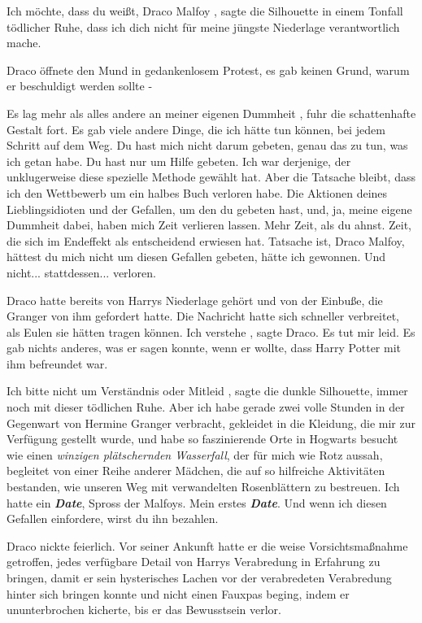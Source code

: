 \glqq Ich möchte, dass du weißt, Draco Malfoy\grqq{} , sagte die Silhouette in
einem Tonfall tödlicher Ruhe, \glqq dass ich dich nicht für meine jüngste
Niederlage verantwortlich mache.\grqq{}

Draco öffnete den Mund in gedankenlosem Protest, es gab keinen Grund, warum er
beschuldigt werden sollte -

\glqq Es lag mehr als alles andere an meiner eigenen Dummheit\grqq{} , fuhr die
schattenhafte Gestalt fort. \glqq Es gab viele andere Dinge, die ich hätte tun
können, bei jedem Schritt auf dem Weg. Du hast mich nicht darum gebeten, genau
das zu tun, was ich getan habe. Du hast nur um Hilfe gebeten. Ich war derjenige,
der unklugerweise diese spezielle Methode gewählt hat. Aber die Tatsache bleibt,
dass ich den Wettbewerb um ein halbes Buch verloren habe. Die Aktionen deines
Lieblingsidioten und der Gefallen, um den du gebeten hast, und, ja, meine eigene
Dummheit dabei, haben mich Zeit verlieren lassen. Mehr Zeit, als du ahnst. Zeit,
die sich im Endeffekt als entscheidend erwiesen hat. Tatsache ist, Draco Malfoy,
hättest du mich nicht um diesen Gefallen gebeten, hätte ich gewonnen. Und
nicht... stattdessen... verloren.\grqq{}

Draco hatte bereits von Harrys Niederlage gehört und von der Einbuße, die
Granger von ihm gefordert hatte. Die Nachricht hatte sich schneller verbreitet,
als Eulen sie hätten tragen können. \glqq Ich verstehe\grqq{} , sagte Draco.
\glqq Es tut mir leid.\grqq{} Es gab nichts anderes, was er sagen konnte, wenn
er wollte, dass Harry Potter mit ihm befreundet war.

\glqq Ich bitte nicht um Verständnis oder Mitleid\grqq{} , sagte die dunkle
Silhouette, immer noch mit dieser tödlichen Ruhe. \glqq Aber ich habe gerade
zwei volle Stunden in der Gegenwart von Hermine Granger verbracht, gekleidet in
die Kleidung, die mir zur Verfügung gestellt wurde, und habe so faszinierende
Orte in Hogwarts besucht wie einen \emph{winzigen plätschernden Wasserfall}, der
für mich wie Rotz aussah, begleitet von einer Reihe anderer Mädchen, die auf so
hilfreiche Aktivitäten bestanden, wie unseren Weg mit verwandelten Rosenblättern
zu bestreuen. Ich hatte ein \textbf{\emph{Date}}, Spross der Malfoys. Mein
erstes \textbf{\emph{Date}}. Und wenn ich diesen Gefallen einfordere, wirst du
ihn bezahlen.\grqq{}

Draco nickte feierlich. Vor seiner Ankunft hatte er die weise Vorsichtsmaßnahme
getroffen, jedes verfügbare Detail von Harrys Verabredung in Erfahrung zu
bringen, damit er sein hysterisches Lachen vor der verabredeten Verabredung
hinter sich bringen konnte und nicht einen Fauxpas beging, indem er
ununterbrochen kicherte, bis er das Bewusstsein verlor.

